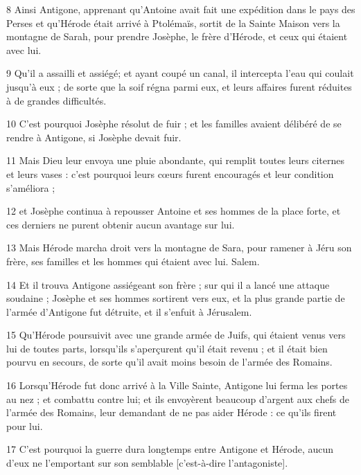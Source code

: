 \par 8 Ainsi Antigone, apprenant qu'Antoine avait fait une expédition dans le pays des Perses et qu'Hérode était arrivé à Ptolémaïs, sortit de la Sainte Maison vers la montagne de Sarah, pour prendre Josèphe, le frère d'Hérode, et ceux qui étaient avec lui.

\par 9 Qu'il a assailli et assiégé; et ayant coupé un canal, il intercepta l'eau qui coulait jusqu'à eux ; de sorte que la soif régna parmi eux, et leurs affaires furent réduites à de grandes difficultés.

\par 10 C'est pourquoi Josèphe résolut de fuir ; et les familles avaient délibéré de se rendre à Antigone, si Josèphe devait fuir.

\par 11 Mais Dieu leur envoya une pluie abondante, qui remplit toutes leurs citernes et leurs vases : c'est pourquoi leurs cœurs furent encouragés et leur condition s'améliora ;

\par 12 et Josèphe continua à repousser Antoine et ses hommes de la place forte, et ces derniers ne purent obtenir aucun avantage sur lui.

\par 13 Mais Hérode marcha droit vers la montagne de Sara, pour ramener à Jéru son frère, ses familles et les hommes qui étaient avec lui. Salem.

\par 14 Et il trouva Antigone assiégeant son frère ; sur qui il a lancé une attaque soudaine ; Josèphe et ses hommes sortirent vers eux, et la plus grande partie de l'armée d'Antigone fut détruite, et il s'enfuit à Jérusalem.

\par 15 Qu'Hérode poursuivit avec une grande armée de Juifs, qui étaient venus vers lui de toutes parts, lorsqu'ils s'aperçurent qu'il était revenu ; et il était bien pourvu en secours, de sorte qu'il avait moins besoin de l'armée des Romains.

\par 16 Lorsqu'Hérode fut donc arrivé à la Ville Sainte, Antigone lui ferma les portes au nez ; et combattu contre lui; et ils envoyèrent beaucoup d'argent aux chefs de l'armée des Romains, leur demandant de ne pas aider Hérode : ce qu'ils firent pour lui.

\par 17 C'est pourquoi la guerre dura longtemps entre Antigone et Hérode, aucun d'eux ne l'emportant sur son semblable [c'est-à-dire l'antagoniste].

